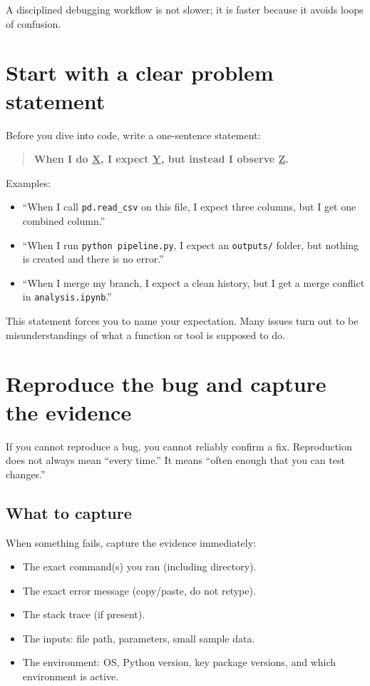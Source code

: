 A disciplined debugging workflow is not slower; it is faster because it avoids loops of confusion.

\section{Start with a clear problem statement}
Before you dive into code, write a one-sentence statement:

\begin{quote}
\textbf{When I do \underline{X}, I expect \underline{Y}, but instead I observe \underline{Z}.}
\end{quote}

Examples:
\begin{itemize}[noitemsep]
  \item ``When I call \texttt{pd.read\_csv} on this file, I expect three columns, but I get one combined column.''
  \item ``When I run \texttt{python pipeline.py}, I expect an \texttt{outputs/} folder, but nothing is created and there is no error.''
  \item ``When I merge my branch, I expect a clean history, but I get a merge conflict in \texttt{analysis.ipynb}.''
\end{itemize}

This statement forces you to name your expectation. Many issues turn out to be misunderstandings of what a function or tool is supposed to do.

\section{Reproduce the bug and capture the evidence}
If you cannot reproduce a bug, you cannot reliably confirm a fix. Reproduction does not always mean ``every time.'' It means ``often enough that you can test changes.''

\subsection{What to capture}
When something fails, capture the evidence immediately:
\begin{itemize}[noitemsep]
  \item The exact command(s) you ran (including directory).
  \item The exact error message (copy/paste, do not retype).
  \item The stack trace (if present).
  \item The inputs: file path, parameters, small sample data.
  \item The environment: OS, Python version, key package versions, and which environment is active.
\end{itemize}

